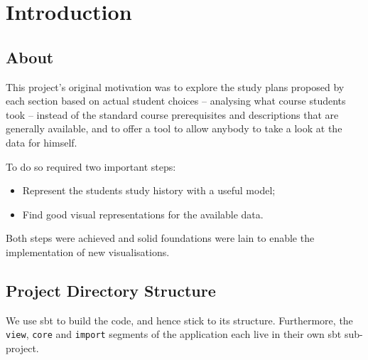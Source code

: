 
\usepackage{multirow}

\graphicspath{{images/}}





%

 \setcounter{page}{1}

\renewcommand{\contentsname}{Table of Contents}
\tableofcontents
\clearpage
\thispagestyle{empty}
\cleardoublepage

 \setcounter{page}{1}

\chapter{Introduction}
\section{About}
This project's original motivation was to explore the study plans proposed by each section based on actual student choices -- analysing what course students took -- instead of the standard course prerequisites and descriptions that are generally available, and to offer a tool to allow anybody to take a look at the data for himself.

To do so required two important steps:
\begin{itemize}
\item Represent the students study history with a useful model;
\item Find good visual representations for the available data.
\end{itemize}

Both steps were achieved and solid foundations were lain to enable the implementation of new visualisations.

\newpage
\section{Project Directory Structure}
We use sbt to build the code, and hence stick to its structure. Furthermore, the \verb|view|, \verb|core| and \verb|import| segments of the application each live in their own sbt sub-project.

